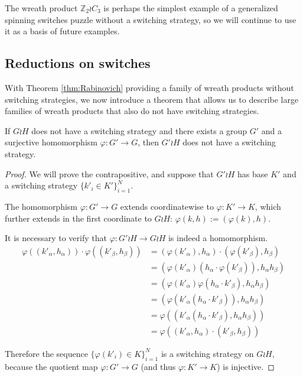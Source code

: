 The wreath product $\mathbb Z_2 \wr C_3$ is perhaps the simplest example of a
generalized spinning switches puzzle without a switching strategy,
so we will continue to use it as a basis of future examples.

\subsection{Reductions on switches}
With Theorem \ref{thm:Rabinovich} providing a family of wreath products without
switching strategies, we now introduce a theorem that allows us to
describe large families of wreath products that also do not have switching
strategies.
\begin{theorem}
  If $G \wr H$ does not have a switching strategy and there exists a group $G'$
  and a surjective homomorphism $\varphi \colon G' \rightarrow G$,
  then ${G'} \wr H$ does not have a switching
  strategy.
  \label{thm:SwitchReduction}
\end{theorem}
\begin{proof}
  We will prove the contrapositive, and suppose that $G' \wr H$ has base $K'$
  and a switching strategy $\{k'_i \in K'\}_{i=1}^N$.

  The homomorphism
  $\varphi\colon G' \rightarrow G$
  extends coordinatewise to
  $\varphi \colon K' \rightarrow K$,
  which further extends in the first coordinate to $G \wr H$:
  $\varphi(k,h) := (\varphi(k), h)$.

  It is necessary to verify that $\varphi\colon G' \wr H \rightarrow G \wr H$
  is indeed a homomorphism.
  \begin{align*}
    \varphi((k'_\alpha, h_\alpha)) \cdot \varphi((k'_\beta, h_\beta))
    &= (\varphi(k'_\alpha), h_\alpha) \cdot (\varphi(k'_\beta), h_\beta) \\
    &= (\varphi(k'_\alpha)(h_\alpha\cdot\varphi(k'_\beta)), h_\alpha h_\beta) \\
    &= (\varphi(k'_\alpha)\varphi(h_\alpha\cdot k'_\beta), h_\alpha h_\beta) \\
    &= (\varphi(k'_\alpha(h_\alpha\cdot k'_\beta)), h_\alpha h_\beta) \\
    &= \varphi((k'_\alpha(h_\alpha\cdot k'_\beta), h_\alpha h_\beta)) \\
    &= \varphi((k'_\alpha, h_\alpha) \cdot (k'_\beta, h_\beta))
  \end{align*}

  Therefore the sequence $\{\varphi(k'_i) \in K\}_{i=1}^N$ is a
  switching strategy on $G \wr H$, because the quotient map
  $\varphi \colon G' \rightarrow G$
  (and thus $\varphi \colon K' \rightarrow K$)
  is injective.
\end{proof}
